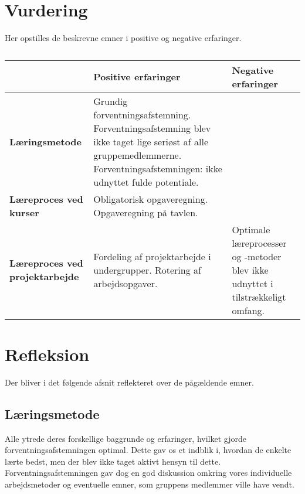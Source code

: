  
\section{Vurdering}
Her opstilles de beskrevne emner i positive og negative erfaringer.
\begin{table}[h]
	\caption{}
	\begin{tabular}{|p{3cm}|p{5cm}|p{5cm}|}
		\hline
		&\textbf{Positive erfaringer}&\textbf{Negative erfaringer}\\ \hline
	\textbf{Læringsmetode}	& Grundig forventningsafstemning. \newline Forventningsafstemning blev ikke taget lige seriøst af alle gruppemedlemmerne. \newline Forventningsafstemningen: ikke udnyttet fulde potentiale. & \\ \hline
	\textbf{Læreproces ved kurser} & Obligatorisk opgaveregning. \newline  Opgaveregning på tavlen. & \\ \hline
	\textbf{Læreproces ved projektarbejde} & Fordeling af projektarbejde i undergrupper. \newline Rotering af arbejdsopgaver. & Optimale læreprocesser og -metoder blev ikke udnyttet i tilstrækkeligt omfang.\\ \hline
		
	\end{tabular}
\end{table}

\section{Refleksion}
Der bliver i det følgende afsnit reflekteret over de pågældende emner.

\subsection{Læringsmetode}
Alle ytrede deres forskellige baggrunde og erfaringer, hvilket gjorde forventningsafstemningen optimal. Dette gav os et indblik i, hvordan de enkelte lærte bedst, men der blev ikke taget aktivt hensyn til dette. Forventningsafstemningen gav dog en god diskussion omkring vores individuelle arbejdsmetoder og eventuelle emner, som gruppens medlemmer ville have vendt.

